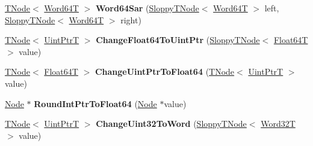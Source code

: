 \begin{DoxyCompactItemize}
\item 
\mbox{\label{classv8_1_1internal_1_1compiler_1_1CodeAssembler_a1be8962653c3aa2e623b06603d99de90}} 
\mbox{\hyperlink{classv8_1_1internal_1_1compiler_1_1TNode}{T\+Node}}$<$ \mbox{\hyperlink{structv8_1_1internal_1_1Word64T}{Word64T}} $>$ {\bfseries Word64\+Sar} (\mbox{\hyperlink{classv8_1_1internal_1_1compiler_1_1SloppyTNode}{Sloppy\+T\+Node}}$<$ \mbox{\hyperlink{structv8_1_1internal_1_1Word64T}{Word64T}} $>$ left, \mbox{\hyperlink{classv8_1_1internal_1_1compiler_1_1SloppyTNode}{Sloppy\+T\+Node}}$<$ \mbox{\hyperlink{structv8_1_1internal_1_1Word64T}{Word64T}} $>$ right)
\item 
\mbox{\label{classv8_1_1internal_1_1compiler_1_1CodeAssembler_a1deb545d1d43c742af70f33e7fb41485}} 
\mbox{\hyperlink{classv8_1_1internal_1_1compiler_1_1TNode}{T\+Node}}$<$ \mbox{\hyperlink{structv8_1_1internal_1_1UintPtrT}{Uint\+PtrT}} $>$ {\bfseries Change\+Float64\+To\+Uint\+Ptr} (\mbox{\hyperlink{classv8_1_1internal_1_1compiler_1_1SloppyTNode}{Sloppy\+T\+Node}}$<$ \mbox{\hyperlink{structv8_1_1internal_1_1Float64T}{Float64T}} $>$ value)
\item 
\mbox{\label{classv8_1_1internal_1_1compiler_1_1CodeAssembler_ab45e7970d0a30efe6a71ab7166d9ed37}} 
\mbox{\hyperlink{classv8_1_1internal_1_1compiler_1_1TNode}{T\+Node}}$<$ \mbox{\hyperlink{structv8_1_1internal_1_1Float64T}{Float64T}} $>$ {\bfseries Change\+Uint\+Ptr\+To\+Float64} (\mbox{\hyperlink{classv8_1_1internal_1_1compiler_1_1TNode}{T\+Node}}$<$ \mbox{\hyperlink{structv8_1_1internal_1_1UintPtrT}{Uint\+PtrT}} $>$ value)
\item 
\mbox{\label{classv8_1_1internal_1_1compiler_1_1CodeAssembler_aaacc98eac91b6654ad30986522d6d5f5}} 
\mbox{\hyperlink{classv8_1_1internal_1_1compiler_1_1Node}{Node}} $\ast$ {\bfseries Round\+Int\+Ptr\+To\+Float64} (\mbox{\hyperlink{classv8_1_1internal_1_1compiler_1_1Node}{Node}} $\ast$value)
\item 
\mbox{\label{classv8_1_1internal_1_1compiler_1_1CodeAssembler_a4405c7ca2eb2081388a2099f133144d2}} 
\mbox{\hyperlink{classv8_1_1internal_1_1compiler_1_1TNode}{T\+Node}}$<$ \mbox{\hyperlink{structv8_1_1internal_1_1UintPtrT}{Uint\+PtrT}} $>$ {\bfseries Change\+Uint32\+To\+Word} (\mbox{\hyperlink{classv8_1_1internal_1_1compiler_1_1SloppyTNode}{Sloppy\+T\+Node}}$<$ \mbox{\hyperlink{structv8_1_1internal_1_1Word32T}{Word32T}} $>$ value)

\end{DoxyCompactItemize}
